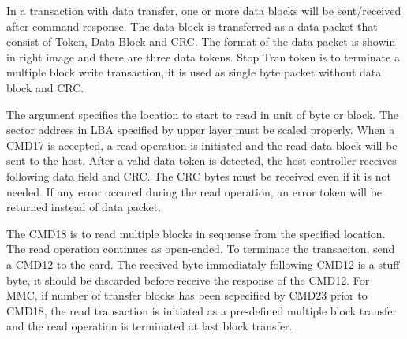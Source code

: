 \secup

\secdown


In a transaction with data transfer, one or more data blocks will be
sent/received after command response. The data block is transferred as a data
packet that consist of Token, Data Block and CRC. The format of the data packet
is showin in right image and there are three data tokens. Stop Tran token is to
terminate a multiple block write transaction, it is used as single byte packet
without data block and CRC.


The argument specifies the location to start to read in unit of byte or block.
The sector address in LBA specified by upper layer must be scaled properly. When
a CMD17 is accepted, a read operation is initiated and the read data block will
be sent to the host. After a valid data token is detected, the host controller
receives following data field and CRC. The CRC bytes must be received even if it
is not needed. If any error occured during the read operation, an error token
will be returned instead of data packet.



The CMD18 is to read multiple blocks in sequense from the specified location.
The read operation continues as open-ended. To terminate the transaciton, send a
CMD12 to the card. The received byte immediataly following CMD12 is a stuff
byte, it should be discarded before receive the response of the CMD12. For MMC,
if number of transfer blocks has been sepecified by CMD23 prior to CMD18, the
read transaction is initiated as a pre-defined multiple block transfer and the
read operation is terminated at last block transfer.

\secup

\secup
